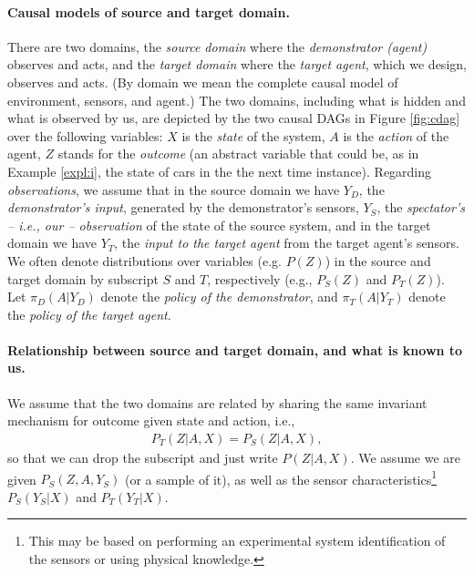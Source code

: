\documentclass[letterpaper]{article} %
\theoremstyle{definition}%
\theoremstyle{definition}
\newcommand{\Obs}{Y}
\newcommand{\Out}{Z}
\newcommand{\todo}[1]{\textcolor{red}{#1}}
\begin{document}
\paragraph{Causal models of source and target domain.} There are two domains, the \emph{source domain} where the \emph{demonstrator (agent)} observes and acts, and the \emph{target domain} where the \emph{target agent}, which we design, observes and acts.
(By domain we mean the complete causal model of environment, sensors, and agent.)
The two domains, including what is hidden and what is observed by us, are depicted by the two causal DAGs in Figure \ref{fig:cdag} over the following variables:
$X$ is the \emph{state} of the system, 
$A$ is the \emph{action} of the agent,
$Z$ stands for the \emph{outcome} (an abstract variable that could be, as in Example \ref{expl:i}, the state of cars in the the next time instance). %
Regarding \emph{observations}, we assume that in the source domain we have
$Y_D$, the \emph{demonstrator's input}, generated by the demonstrator's sensors,
$Y_S$, the \emph{spectator's -- i.e., our -- observation} of the state of the source system,
and in the target domain we have
$Y_T$, the \emph{input to the target agent} from the target agent's sensors.
We often denote distributions over variables (e.g. $P(Z)$) in the source and target domain by subscript $S$ and $T$, respectively (e.g., $P_S(Z)$ and $P_T(Z)$).
Let $\pi_D(A|Y_D)$ denote the \emph{policy of the demonstrator},
and  $\pi_T(A|Y_T)$ denote the \emph{policy of the target agent}.

\paragraph{Relationship between source and target domain, and what is known to us.} 
We assume that the two domains are related by sharing the same invariant mechanism for outcome given state and action, i.e., 
\begin{align*}
P_T(\Out|A, X)=P_S(\Out|A, X),
\end{align*}
so that we can drop the subscript and just write $P(\Out|A,X)$.
%
We assume we are given $P_S(\Out, A, \Obs_S)$ (or a sample of it), as well as the sensor characteristics\footnote{This may be based on performing an experimental system identification of the sensors or using physical knowledge.} $P_S(Y_S|X)$ and $P_T(Y_T|X)$.
\end{document}
